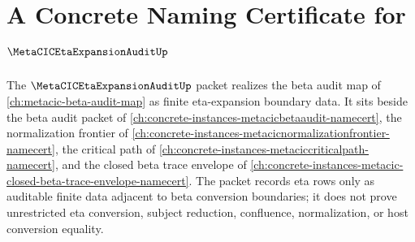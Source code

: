 \chapter{A Concrete Naming Certificate for $\MetaCICEtaExpansionAuditUp$}
\label{ch:concrete-instances-metacic-eta-expansion-audit-namecert}

The $\MetaCICEtaExpansionAuditUp$ packet realizes the beta audit map of
\autoref{ch:metacic-beta-audit-map} as finite eta-expansion boundary
data. It sits beside the beta audit packet of
\autoref{ch:concrete-instances-metacicbetaaudit-namecert}, the normalization
frontier of \autoref{ch:concrete-instances-metacicnormalizationfrontier-namecert},
the critical path of \autoref{ch:concrete-instances-metaciccriticalpath-namecert},
and the closed beta trace envelope of
\autoref{ch:concrete-instances-metacic-closed-beta-trace-envelope-namecert}. The
packet records eta rows only as auditable finite data adjacent to beta
conversion boundaries; it does not prove unrestricted eta conversion, subject
reduction, confluence, normalization, or host conversion equality.

